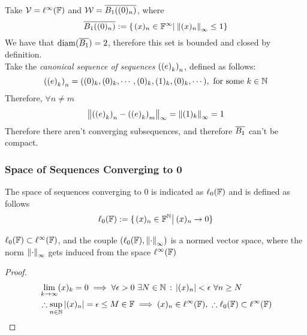 \documentclass[../complete.tex]{subfiles}
\begin{document}
\begin{eg}
	Take $\mathcal{V}=\ell^\infty(\mathbb{F})$ and $\mathcal{W}=\overline{B_1( (0)_n )}$, where $$\overline{B_1( (0)_n )}:=\{\left.(x)_n\in\mathbb{F}^\infty\right|_{}\norm{(x)_n}_\infty\le1\}$$
	We have that $\operatorname{diam}(\overline{B_1})=2$, therefore this set is bounded and closed by definition.\\
	Take the \textit{canonical sequence of sequences} $\left(\left(e\right)_{k}\right)_{n}$, defined as follows:
	\begin{equation*}
		\seqseq{e}{k}{n}=((0)_k,(0)_k,\cdots,(0)_k,(1)_k,(0)_k,\cdots),\ \text{for some}\ k\in\N
	\end{equation*}
	Therefore, $\forall n\ne m$
	\begin{equation*}
		\norm{\left(\left(e\right)_{k}\right)_{n}-\left(\left(e\right)_{k}\right)_{m}}_{\infty}=\norm{(1)_k}_\infty=1
	\end{equation*}
	Therefore there aren't converging subsequences, and therefore $\overline{B_1}$ can't be compact.
\end{eg}
\subsubsection{Space of Sequences Converging to 0}
\begin{dfn}
	The space of sequences converging to $0$ is indicated as $\ell_0(\mathbb{F})$ and is defined as follows
	\begin{equation}
		\ell_0(\mathbb{F}):=\{\left.(x)_n\in\mathbb{F}^{\mathbb{N}}\right|_{}(x)_n\to0\}
		\label{eq:ellnot}
	\end{equation}
\end{dfn}
\begin{prop}
	$\ell_0(\mathbb{F})\subset\ell^\infty(\mathbb{F})$, and the couple $(\ell_0(\mathbb{F}),\norm{\cdot}_\infty)$ is a normed vector space, where the norm $\norm{\cdot}_\infty$ gets induced from the space $\ell^\infty(\mathbb{F})$
\end{prop}
\begin{proof}
	\begin{equation*}
		\begin{aligned}
			&\lim_{k\to\infty}(x)_k=0\implies\forall\epsilon>0\ \exists N\in\N\st\abs{(x)_n}<\epsilon\ \forall n\ge N\\
			&\therefore\sup_{n\in\N}\abs{(x)_n}=\epsilon\le M\in\F\implies(x)_n\in\ell^\infty(\F),\ \therefore\ell_0(\F)\subset\ell^\infty(\F)
		\end{aligned}
	\end{equation*}
\end{proof}
\end{document}
